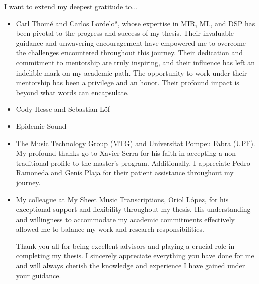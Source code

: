 

\begin{acknowledgement}

I want to extend my deepest gratitude to...

\begin{itemize}
\item Carl Thomé and Carlos Lordeloª, whose expertise in MIR, ML, and DSP has been pivotal to the progress and success of my thesis. Their invaluable guidance and unwavering encouragement have empowered me to overcome the challenges encountered throughout this journey. Their dedication and commitment to mentorship are truly inspiring, and their influence has left an indelible mark on my academic path. The opportunity to work under their mentorship has been a privilege and an honor. Their profound impact is beyond what words can encapsulate.

\vspace*{3mm}
\item Cody Hesse and Sebastian Löf

\vspace*{3mm}
\item Epidemic Sound

\vspace*{3mm}
\item The Music Technology Group (MTG) and Universitat Pompeu Fabra (UPF). My profound thanks go to Xavier Serra for his faith in accepting a non-traditional profile to the master's program. Additionally, I appreciate Pedro Ramoneda and Genís Plaja for their patient assistance throughout my journey.

\vspace*{3mm}
\item My colleague at My Sheet Music Transcriptions, Oriol López, for his exceptional support and flexibility throughout my thesis. His understanding and willingness to accommodate my academic commitments effectively allowed me to balance my work and research responsibilities.

\vspace*{3mm}
Thank you all for being excellent advisors and playing a crucial role in completing my thesis. I sincerely appreciate everything you have done for me and will always cherish the knowledge and experience I have gained under your guidance.

\vspace*{3mm}
\end{itemize}

\newpage
\end{acknowledgement}